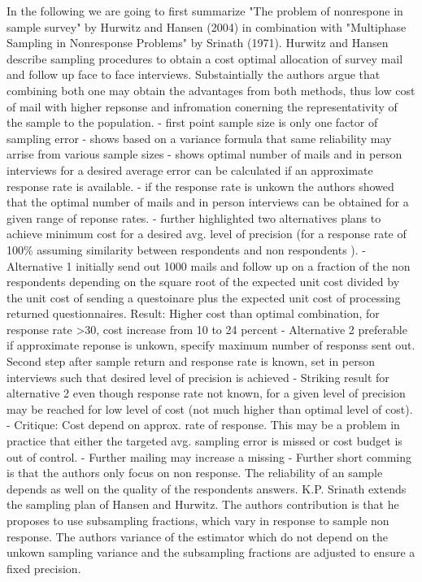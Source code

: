 In the following we are going to first summarize "The problem of nonrespone in sample survey" by Hurwitz and Hansen (2004) in combination with "Multiphase Sampling in Nonresponse Problems" by Srinath (1971). 
Hurwitz and Hansen describe sampling procedures to obtain a cost optimal allocation of survey mail and follow up face to face interviews. Substaintially the authors argue that combining both one may obtain the advantages from both methods, thus low cost of mail with higher repsonse and infromation conerning the representativity of the sample to the population. 
- first point sample size is only one factor of sampling error
- shows based on a variance formula that same reliability may arrise from various sample sizes
- shows optimal number of mails and in person interviews for a desired average error can be calculated if an approximate response rate is available.
- if the response rate is unkown the authors showed that the optimal number of mails and in person interviews can be obtained for a given range of reponse rates.
-  further highlighted two alternatives plans to achieve minimum cost for a desired avg. level of precision (for a response rate of 100\% assuming similarity between respondents and non respondents ).
- Alternative 1 initially send out 1000 mails and follow up on a fraction of the non respondents depending on the square root of the expected unit cost divided by the unit cost of sending a questoinare plus the expected unit cost of processing returned questionnaires.
  Result: Higher cost than optimal combination, for response rate >30, cost increase from 10 to 24 percent
- Alternative 2 preferable if approximate reponse is unkown, specify maximum number of responss sent out. Second step after sample return and response rate is known, set in person interviews such that desired level of precision is achieved
- Striking result for alternative 2 even though response rate not known, for a given level of precision may be reached for low level of cost (not much higher than optimal level of cost). 
- Critique: Cost depend on approx. rate of response. This may be a problem in practice that either the targeted avg. sampling error is missed or cost budget is out of control. 
- Further mailing may increase a missing
- Further short comming is that the authors only focus on non response. The reliability of an sample depends as well on the quality of the respondents answers. 
K.P. Srinath extends the sampling plan of Hansen and Hurwitz. The authors contribution is that he proposes to use subsampling fractions, which vary in response to sample non response. The authors variance of the estimator which do not depend on the unkown sampling variance and the subsampling fractions are adjusted to ensure a fixed precision.  

\endinput
